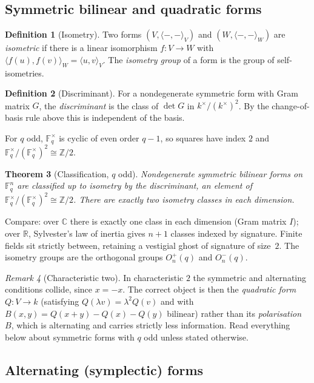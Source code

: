 \documentclass[11pt,a4paper]{article}
\newtheorem{theorem}{Theorem}[section]
\theoremstyle{definition}
\newtheorem{definition}[theorem]{Definition}
\theoremstyle{remark}
\newtheorem{remark}[theorem]{Remark}
\newcommand{\FF}{\mathbb{F}}
\newcommand{\CC}{\mathbb{C}}
\newcommand{\RR}{\mathbb{R}}
\newcommand{\ZZ}{\mathbb{Z}}
\newcommand{\ip}[2]{\langle #1, #2 \rangle}
\begin{document}
\subsection{Symmetric bilinear and quadratic forms}

\begin{definition}[Isometry]
Two forms $(V, \ip{-}{-}_V)$ and $(W, \ip{-}{-}_W)$ are \emph{isometric} if there is a linear
isomorphism $f : V \to W$ with $\ip{f(u)}{f(v)}_W = \ip{u}{v}_V$. The \emph{isometry group}
of a form is the group of self-isometries.
\end{definition}

\begin{definition}[Discriminant]
For a nondegenerate symmetric form with Gram matrix $G$, the \emph{discriminant} is the class
of $\det G$ in $k^{\times}/(k^{\times})^{2}$. By the change-of-basis rule above this is
independent of the basis.
\end{definition}

For $q$ odd, $\FF_q^{\times}$ is cyclic of even order $q-1$, so squares have index $2$ and
$\FF_q^{\times}/(\FF_q^{\times})^{2} \cong \ZZ/2$.

\begin{theorem}[Classification, $q$ odd]
Nondegenerate symmetric bilinear forms on $\FF_q^{n}$ are classified up to isometry by the
discriminant, an element of $\FF_q^{\times}/(\FF_q^{\times})^{2} \cong \ZZ/2$. There are
exactly \emph{two} isometry classes in each dimension.
\end{theorem}

Compare: over $\CC$ there is exactly one class in each dimension (Gram matrix $I$); over
$\RR$, Sylvester's law of inertia gives $n+1$ classes indexed by signature. Finite fields sit
strictly between, retaining a vestigial ghost of signature of size~$2$. The isometry groups
are the orthogonal groups $O_n^{+}(q)$ and $O_n^{-}(q)$.

\begin{remark}[Characteristic two]
In characteristic $2$ the symmetric and alternating conditions collide, since $x = -x$. The
correct object is then the \emph{quadratic form} $Q : V \to k$ (satisfying $Q(\lambda v) =
\lambda^{2}Q(v)$ and with $B(x,y) = Q(x+y) - Q(x) - Q(y)$ bilinear) rather than its
\emph{polarisation} $B$, which is alternating and carries strictly less information. Read
everything below about symmetric forms with $q$ odd unless stated otherwise.
\end{remark}

\subsection{Alternating (symplectic) forms}
\end{document}
